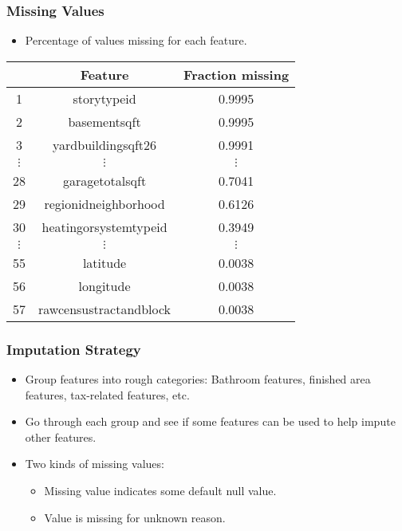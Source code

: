 \documentclass{beamer}
\begin{document}
\begin{frame}
\frametitle{Missing Values}
\begin{itemize}
\item Percentage of values missing for each feature.
\end{itemize}
\begin{center}
\footnotesize
\begin{tabular}{|c|c|c|} \hline
\quad & Feature & Fraction missing \\ \hline
1 & storytypeid & 0.9995 \\
2 & basementsqft & 0.9995 \\
3 & yardbuildingsqft26 & 0.9991 \\
$\vdots$ & $\vdots$ & $\vdots$ \\
28 & garagetotalsqft & 0.7041 \\
29 & regionidneighborhood & 0.6126 \\
30 & heatingorsystemtypeid & 0.3949 \\
$\vdots$ & $\vdots$ & $\vdots$ \\
55 & latitude & 0.0038 \\
56 & longitude & 0.0038 \\
57 & rawcensustractandblock & 0.0038 \\
\hline
\end{tabular}
\end{center}
\end{frame}

\begin{frame}
\frametitle{Imputation Strategy}
\begin{itemize}
\item Group features into rough categories: Bathroom features, finished area features, tax-related features, etc.
\item Go through each group and see if some features can be used to help impute other features.
\item Two kinds of missing values:
\begin{itemize}
\item Missing value indicates some default null value.
\item Value is missing for unknown reason.
\end{itemize}
\end{itemize}
\end{frame}
\end{document}
